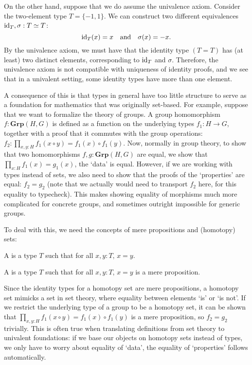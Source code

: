 On the other hand, suppose that we do assume the univalence axiom. Consider the two-element type $ T = \{ -1, 1 \} $. We can construct two different equivalences $ \text{id}_{T}, \sigma: T \simeq T $:
\[ \text{id}_{T}(x) = x \quad \text{and} \quad \sigma(x) = -x. \]
By the univalence axiom, we must have that the identity type $ (T = T) $ has (at least) two distinct elements, corresponding to $ \text{id}_{T} $ and $ \sigma $. Therefore, the univalence axiom is not compatible with uniqueness of identity proofs, and we see that in a univalent setting, some identity types have more than one element.

A consequence of this is that types in general have too little structure to serve as a foundation for mathematics that was originally set-based. For example, suppose that we want to formalize the theory of groups. A group homomorphism $ f: \mathbf{Grp}(H, G) $ is defined as a function on the underlying types $ f_1: H \to G $, together with a proof that it commutes with the group operations: $ f_2: \prod_{x, y: H} f_1(x \circ y) = f_1(x) \circ f_1(y) $. Now, normally in group theory, to show that two homomorphisms $ f, g: \mathbf{Grp}(H, G) $ are equal, we show that $ \prod_{x: H} f_1(x) = g_1(x) $, the `data' is equal. However, if we are working with types instead of sets, we also need to show that the proofs of the `properties' are equal: $ f_2 = g_2 $ (note that we actually would need to transport $ f_2 $ here, for this equality to typecheck). This makes showing equality of morphisms much more complicated for concrete groups, and sometimes outright impossible for generic groups.

To deal with this, we need the concepts of mere propositions and (homotopy) sets:

\begin{definition}
  A  is a type $ T $ such that for all $ x, y: T $, $ x = y $.
\end{definition}

\begin{definition}
  A  is a type $ T $ such that for all $ x, y: T $, $ x = y $ is a mere proposition.
\end{definition}

Since the identity types for a homotopy set are mere propositions, a homotopy set mimicks a set in set theory, where equality between elements `is' or `is not'. If we restrict the underlying type of a group to be a homotopy set, it can be shown that $ \prod_{x, y: H} f_1(x \circ y) = f_1(x) \circ f_1(y) $ is a mere proposition, so $ f_2 = g_2 $ trivially. This is often true when translating definitions from set theory to univalent foundations: if we base our objects on homotopy sets instead of types, we only have to worry about equality of `data', the equality of `properties' follows automatically.

